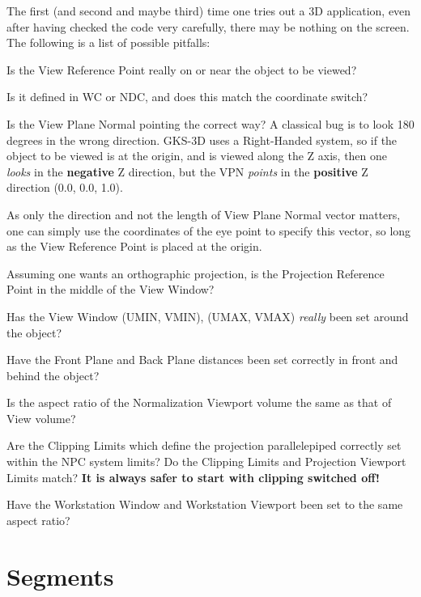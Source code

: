 The first (and second and maybe third) time one tries out a 3D application,
even after having checked the code very carefully, there may be nothing
on the screen. The following is a list of possible pitfalls:
\begin{OL}
\item Is the View Reference Point really on or near the object to be viewed?
\item Is it defined in WC or NDC, and does this match the coordinate switch?
\item Is the View Plane Normal pointing the correct way?
A classical bug is to look 180 degrees in the wrong direction.
GKS-3D uses a Right-Handed system, so if the object to be viewed is
at the origin, and is viewed along the Z axis, then one
{\it looks} in the {\bf negative} Z direction, but the VPN
{\it points} in the {\bf positive} Z direction (0.0, 0.0, 1.0).
\begin{note}
As only the direction and not the length of View Plane Normal vector
matters, one can simply use the coordinates of the eye point to specify this
vector, so long as the View Reference Point is placed at the origin.
\end{note}
\item Assuming one wants an orthographic projection, is the Projection
Reference Point in the middle of the View Window?
\item Has the View Window (UMIN, VMIN), (UMAX, VMAX)
{\it really} been set around the object?
\item Have the Front Plane and Back Plane distances been set correctly
in front and behind the object?
\item Is the aspect ratio of the Normalization Viewport volume the same
as that of View volume?
\item Are the Clipping Limits which define the projection parallelepiped
correctly set within the NPC system limits? Do the Clipping Limits
and Projection Viewport Limits match?
{\bf It is always safer to start with clipping switched off!}
\item Have the Workstation Window and Workstation Viewport been set
to the same aspect ratio?
\end{OL}
\section{Segments}
 
